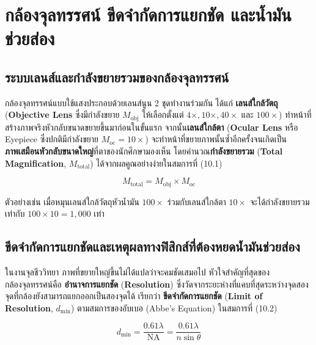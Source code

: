 \clearpage

\chapter{กล้องจุลทรรศน์ ขีดจำกัดการแยกชัด และน้ำมันช่วยส่อง}

\section{ระบบเลนส์และกำลังขยายรวมของกล้องจุลทรรศน์}

กล้องจุลทรรศน์แบบใช้แสงประกอบด้วยเลนส์นูน 2 ชุดทำงานร่วมกัน ได้แก่ \textbf{เลนส์ใกล้วัตถุ} (\textbf{Objective Lens} ซึ่งมีกำลังขยาย $M_{\text{obj}}$ ให้เลือกตั้งแต่ $4\times, 10\times, 40\times$ และ $100\times$) ทำหน้าที่สร้างภาพจริงหัวกลับขนาดขยายขึ้นมาก่อนในขั้นแรก จากนั้น\textbf{เลนส์ใกล้ตา} (\textbf{Ocular Lens} หรือ Eyepiece ซึ่งปกติมีกำลังขยาย $M_{\text{oc}} = 10\times$) จะทำหน้าที่ขยายภาพนั้นซ้ำอีกครั้งจนเกิดเป็น\textbf{ภาพเสมือนหัวกลับขนาดใหญ่}ที่ตาของนักศึกษามองเห็น โดยคำนวณ\textbf{กำลังขยายรวม} (\textbf{Total Magnification}, $M_{\text{total}}$) ได้จากผลคูณอย่างง่ายในสมการที่ (10.1)

\begin{equation}
    M_{\text{total}} = M_{\text{obj}} \times M_{\text{oc}}
\end{equation}

ตัวอย่างเช่น เมื่อหมุนเลนส์ใกล้วัตถุหัวน้ำมัน $100\times$ ร่วมกับเลนส์ใกล้ตา $10\times$ จะได้กำลังขยายรวมเท่ากับ $100 \times 10 = 1{,}000$ เท่า

\section{ขีดจำกัดการแยกชัดและเหตุผลทางฟิสิกส์ที่ต้องหยดน้ำมันช่วยส่อง}

ในงานจุลชีววิทยา ภาพที่ขยายใหญ่ขึ้นไม่ได้แปลว่าจะคมชัดเสมอไป หัวใจสำคัญที่สุดของกล้องจุลทรรศน์คือ \textbf{อำนาจการแยกชัด} (\textbf{Resolution}) ซึ่งวัดจากระยะห่างที่แคบที่สุดระหว่างจุดสองจุดที่กล้องยังสามารถแยกออกเป็นสองจุดได้ เรียกว่า \textbf{ขีดจำกัดการแยกชัด} (\textbf{Limit of Resolution}, $d_{\min}$) ตามสมการของอับเบอ (Abbe's Equation) ในสมการที่ (10.2)

\begin{equation}
    d_{\min} = \frac{0.61 \lambda}{\text{NA}} = \frac{0.61 \lambda}{n \sin\theta}
\end{equation}

